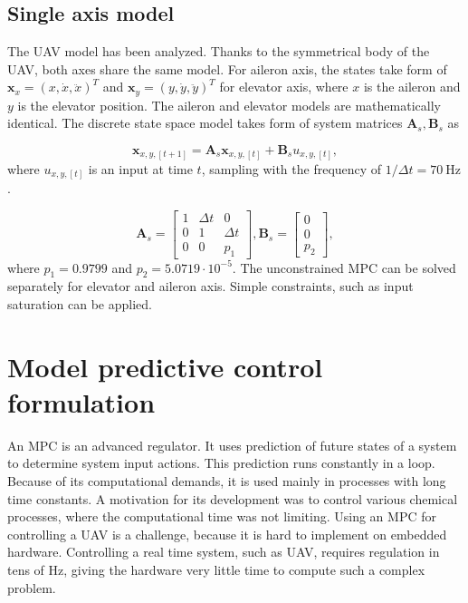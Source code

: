 \documentclass[a4paper,11pt,titlepage]{article}
\newcommand{\jed}[1]{\ensuremath{~\mathrm{#1}}}
\begin{document}


\subsection{Single axis model}
The UAV model has been analyzed\cite{tomas}. Thanks to the symmetrical body of the UAV, both axes share the same model. For aileron axis, the states take form of $\textbf{x}_x = (x, \dot{x}, \ddot{x})^T$ and $\textbf{x}_y = (y, \dot{y}, \ddot{y})^T$ for elevator axis, where $x$ is the aileron and $y$ is the elevator position. The aileron and elevator models are mathematically identical. The discrete state space model takes form of system matrices $\textbf{A}_s, \textbf{B}_s$ as

\begin{equation}
\label{eq:state_space_model_simple}
\textbf{x}_{x,y,[t+1]} = \textbf{A}_{s} \textbf{x}_{x,y, [t]} +\textbf{B}_{s} u_{x,y, [t]},
\end{equation} 
where $u_{x,y,[t]}$ is an input at time $t$, sampling with the frequency of $1/\Delta t = 70\jed{Hz}$.

\begin{equation}
\textbf{A}_{s} =
  \begin{bmatrix}
  1 & \Delta t & 		0 \\
  0 & 		 1 & \Delta t \\
  0	& 		 0 &		p_1
  \end{bmatrix},\textbf{B}_{s} = \begin{bmatrix}
  0 \\
  0 \\
  p_2
  \end{bmatrix}, 
\end{equation}
where $p_1 = 0.9799$ and $p_2 = 5.0719\cdot10^{-5}$. The unconstrained MPC can be solved separately for elevator and aileron axis. Simple constraints, such as input saturation can be applied.

\section{Model predictive control formulation}
\label{sec:Model_predictive_control_formulation}

An MPC is an advanced regulator. It uses prediction of future states of a system to determine system input actions. This prediction runs constantly in a loop. Because of its computational demands, it is used mainly in processes with long time constants. A motivation for its development was to control various chemical processes, where the computational time was not limiting. Using an MPC for controlling a UAV is a challenge, because it is hard to implement on embedded hardware. Controlling a real time system, such as UAV, requires regulation in tens of Hz, giving the hardware very little time to compute such a complex problem.
\end{document}
